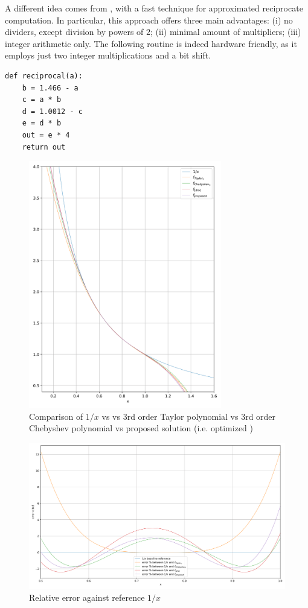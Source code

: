A different idea comes from \cite{drom}, with a fast technique for approximated reciprocate computation. In particular, this approach offers three main advantages: (i) no dividers, except division by powers of $2$; (ii) minimal amount of multipliers; (iii) integer arithmetic only.
The following routine is indeed hardware friendly, as it employs just two integer multiplications and a bit shift.
\begin{verbatim}
def reciprocal(a):
    b = 1.466 - a
    c = a * b
    d = 1.0012 - c
    e = d * b
    out = e * 4
    return out
\end{verbatim}
\begin{figure}
    \centering
    \includegraphics[width=0.75\textwidth]{figures/reciprocate_real_vs_taylor_vs_drom.pdf}
    \caption{Comparison of $1/x$ vs \cite{drom} vs 3rd order Taylor polynomial vs 3rd order Chebyshev polynomial vs proposed solution (i.e. optimized \cite{drom})}
    \label{fig:0203012875432985734}
\end{figure}
\begin{figure}
    \includegraphics[width=1\textwidth]{figures/reciprocate_real_vs_taylor_vs_drom_error.pdf}\caption{Relative error against reference $1/x$}\label{fig:relative_error_00001}
\end{figure}
